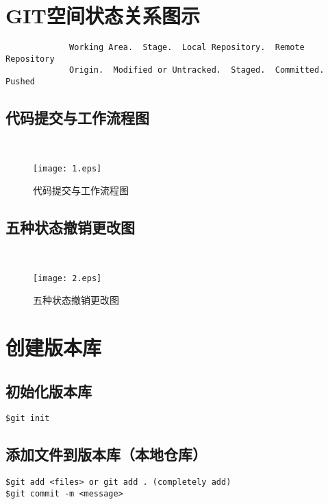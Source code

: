 \section{GIT空间状态关系图示}

\begin{lstlisting}
             Working Area.  Stage.  Local Repository.  Remote Repository
             Origin.  Modified or Untracked.  Staged.  Committed.  Pushed
\end{lstlisting}


\subsection{代码提交与工作流程图}

~


\begin{figure}[!h]
  \centering
  \texttt{[image: 1.eps]}
  \caption{代码提交与工作流程图}
\end{figure}


\subsection{五种状态撤销更改图}

~


\begin{figure}[!h]
  \centering
  \texttt{[image: 2.eps]}
  \caption{五种状态撤销更改图}
\end{figure}
\newpage
\section{创建版本库}
\subsection{初始化版本库}
\begin{lstlisting}
$git init
\end{lstlisting}

\subsection{添加文件到版本库（本地仓库）}
\begin{lstlisting}
$git add <files> or git add . (completely add)
$git commit -m <message>
\end{lstlisting}
~\\
~\\
~\\
